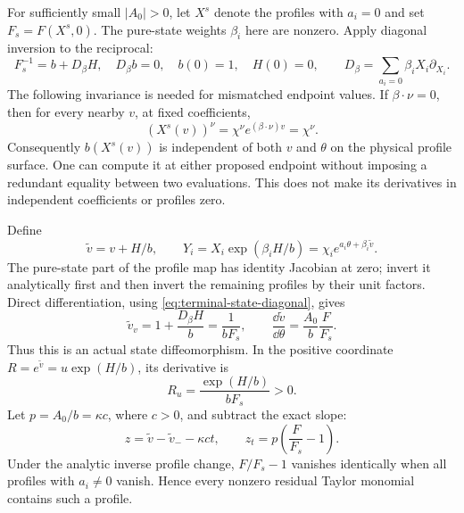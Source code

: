 For sufficiently small \(|A_0|>0\), let \(X^s\) denote the profiles
with \(a_i=0\) and set \(F_s=F(X^s,0)\).  The pure-state weights
\(\beta_i\) here are nonzero.  Apply diagonal inversion to the reciprocal:
\begin{equation}\label{eq:terminal-state-diagonal}
 F_s^{-1}=b+D_\beta H,\quad D_\beta b=0,\quad
 b(0)=1,\quad H(0)=0,\qquad
 D_\beta=\sum_{a_i=0}\beta_iX_i\partial_{X_i}.
\end{equation}
The following invariance is needed for mismatched endpoint values.  If
\(\beta\cdot\nu=0\), then for every nearby \(v\), at fixed
coefficients,
\begin{equation}\label{eq:terminal-state-invariant}
 (X^s(v))^\nu=\chi^\nu e^{(\beta\cdot\nu)v}=\chi^\nu.
\end{equation}
Consequently \(b(X^s(v))\) is independent of both \(v\) and \(\theta\)
on the physical profile surface.  One can compute it at either proposed
endpoint without imposing a redundant equality between two evaluations.
This does not make its derivatives in independent coefficients or profiles
zero.

Define
\begin{equation}\label{eq:terminal-state-change}
 \widetilde v=v+H/b,\qquad
 Y_i=X_i\exp(\beta_iH/b)
      =\chi_i e^{a_i\theta+\beta_i\widetilde v}.
\end{equation}
The pure-state part of the profile map has identity Jacobian at zero;
invert it analytically first and then invert the remaining profiles by
their unit factors.  Direct differentiation, using
\eqref{eq:terminal-state-diagonal}, gives
\begin{equation}\label{eq:terminal-state-jacobian}
 \widetilde v_v=1+\frac{D_\beta H}{b}=\frac1{bF_s},
 \qquad
 \frac{\dd\widetilde v}{\dd\theta}
 =\frac{A_0}{b}\frac{F}{F_s}.
\end{equation}
Thus this is an actual state diffeomorphism.  In the positive coordinate
\(R=e^{\widetilde v}=u\exp(H/b)\), its derivative is
\[
 R_u=\frac{\exp(H/b)}{bF_s}>0.
\]
Let \(p=A_0/b=\kappa c\), where \(c>0\), and subtract the exact slope:
\begin{equation}\label{eq:terminal-small-residual}
 z=\widetilde v-\widetilde v_- -\kappa ct,
 \qquad z_t=p\left(\frac{F}{F_s}-1\right).
\end{equation}
Under the analytic inverse profile change, \(F/F_s-1\) vanishes
identically when all profiles with \(a_i\ne0\) vanish.  Hence every
nonzero residual Taylor monomial contains such a profile.

